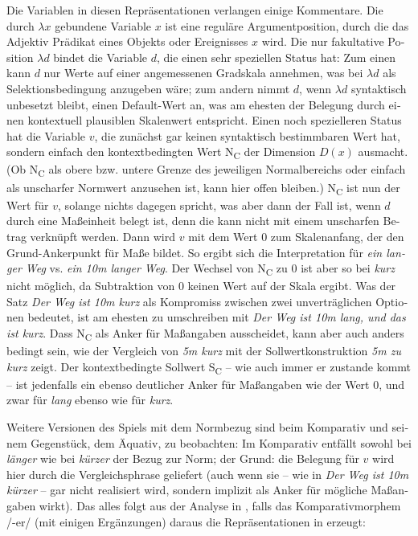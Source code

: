\documentclass[output=paper,colorlinks,citecolor=brown]{langscibook}
\begin{document}
\begin{otherlanguage}{german}
\noindent Die Variablen in diesen Repräsentationen verlangen einige Kommentare. Die durch $\lambda x$  gebundene Variable $x$ ist eine reguläre Argumentposition, durch die das Adjektiv Prädikat eines Objekts oder Ereignisses $x$ wird. Die nur fakultative Position $\lambda d$ bindet die Variable $d$, die einen sehr speziellen Status hat: Zum einen kann $d$ nur Werte auf einer angemessenen Gradskala annehmen, was bei $\lambda d$ als Selektionsbedingung anzugeben wäre; zum andern nimmt $d$, wenn $\lambda d$ syntaktisch unbesetzt bleibt, einen Default-Wert an, was am ehesten der Belegung durch einen kontextuell plausiblen Skalenwert entspricht. Einen noch spezielleren Status hat die Variable $v$, die zunächst gar keinen syntaktisch bestimmbaren Wert hat, sondern einfach den kontextbedingten Wert N\textsubscript{C} der Dimension $D(x)$ ausmacht. (Ob N\textsubscript{C} als obere bzw. untere Grenze des jeweiligen Normalbereichs oder einfach als unscharfer Normwert anzusehen ist, kann hier offen bleiben.) N\textsubscript{C} ist nun der Wert für $v$, solange nichts dagegen spricht, was aber dann der Fall ist, wenn $d$ durch eine Maßeinheit belegt ist, denn die kann nicht mit einem unscharfen Betrag verknüpft werden. Dann wird $v$ mit dem Wert 0 zum Skalenanfang, der den Grund-Ankerpunkt für Maße bildet. So ergibt sich die Interpretation für \textit{ein langer Weg} vs. \textit{ein 10m langer Weg}. Der Wechsel von N\textsubscript{C} zu 0 ist aber so bei \textit{kurz} nicht möglich, da Subtraktion von 0 keinen Wert auf der Skala ergibt. Was der Satz \textit{Der Weg ist 10m kurz} als Kompromiss zwischen zwei unverträglichen Optionen bedeutet, ist am ehesten zu umschreiben mit \textit{Der Weg ist 10m lang, und das ist kurz}. Dass N\textsubscript{C} als Anker für Maßangaben ausscheidet, kann aber auch anders bedingt sein, wie der Vergleich von \textit{5m kurz} mit der Sollwertkonstruktion \textit{5m zu kurz} zeigt. Der kontextbedingte Sollwert S\textsubscript{C} -- wie auch immer er zustande kommt -- ist jedenfalls ein ebenso deutlicher Anker für Maßangaben wie der Wert 0, und zwar für \textit{lang} ebenso wie für \textit{kurz}.

Weitere Versionen des Spiels mit dem Normbezug sind beim Komparativ und seinem Gegenstück, dem Äquativ, zu beobachten: Im Komparativ entfällt sowohl bei \textit{länger} wie bei \textit{kürzer} der Bezug zur Norm; der Grund: die Belegung für $v$ wird hier durch die Vergleichsphrase geliefert (auch wenn sie -- wie in \textit{Der Weg ist 10m kürzer} -- gar nicht realisiert wird, sondern implizit als Anker für mögliche Maßangaben wirkt). Das alles folgt aus der Analyse in , falls das Komparativmorphem /-er/ (mit einigen Ergänzungen) daraus die Repräsentationen in  erzeugt:


\end{otherlanguage}
\end{document}
